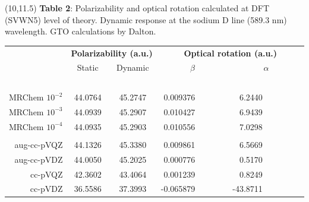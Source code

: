 \documentclass[a0,draft,portrait]{a0poster}
\begin{document}
\begin{textblock}{7}(10,11.5)
\footnotesize
\textbf{Table 2}: Polarizability and optical rotation calculated at DFT (SVWN5) 
level of theory. Dynamic response at the sodium D line (589.3 nm) wavelength.
GTO calculations by Dalton\cite{Dalton}.
\begin{table}
    \normalsize
    \centering
    \begin{tabular}{|r|cc|rr|}
	\hline&
        \multicolumn{2}{c|}{\textbf{Polarizability (a.u.)}}&
        \multicolumn{2}{c|}{\textbf{Optical rotation (a.u.)}}\\
                         & Static        & Dynamic       &
                         \multicolumn{1}{c}{$\beta$}&
                         \multicolumn{1}{c|}{$\alpha$}\\
	\hline
	\hspace{55mm}\   &\hspace{62mm}\ &\hspace{62mm}\ &\hspace{62mm}\ &\hspace{62mm}\ \\
	MRChem $10^{-2}$ & 44.0764       & 45.2747       & 0.009376\ \ \ \ \ \ \ &   6.2440\ \ \ \ \ \ \ \ \ \\
	MRChem $10^{-3}$ & 44.0939       & 45.2907       & 0.010427\ \ \ \ \ \ \ &   6.9439\ \ \ \ \ \ \ \ \ \\
	MRChem $10^{-4}$ & 44.0935       & 45.2903       & 0.010556\ \ \ \ \ \ \ &   7.0298\ \ \ \ \ \ \ \ \ \\
	                 &               &               &                       &                           \\
	aug-cc-pVQZ      & 44.1326       & 45.3380       & 0.009861\ \ \ \ \ \ \ &   6.5669\ \ \ \ \ \ \ \ \ \\
	aug-cc-pVDZ      & 44.0050       & 45.2025       & 0.000776\ \ \ \ \ \ \ &   0.5170\ \ \ \ \ \ \ \ \ \\
	    cc-pVQZ      & 42.3602       & 43.4064       & 0.001239\ \ \ \ \ \ \ &   0.8249\ \ \ \ \ \ \ \ \ \\
	    cc-pVDZ      & 36.5586       & 37.3993       &-0.065879\ \ \ \ \ \ \ & -43.8711\ \ \ \ \ \ \ \ \ \\

\end{tabular}
\end{table}
\end{textblock}
\end{document}

